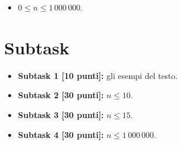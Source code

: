 \begin{itemize}[nolistsep, noitemsep]
  \item $0 \le n \le 1\,000\,000$.
\end{itemize}

  \section*{Subtask}
  \begin{itemize}
    \item \textbf{Subtask 1 [10 punti]:} gli esempi del testo.
    \item \textbf{Subtask 2 [30 punti]:} $n \leq 10$.
    \item \textbf{Subtask 3 [30 punti]:} $n \leq 15$.
    \item \textbf{Subtask 4 [30 punti]:} $n \leq 1\,000\,000$.
  \end{itemize}
  
